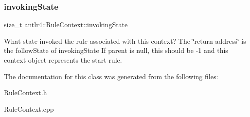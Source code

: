 \subsubsection{\texorpdfstring{invoking\+State}{invokingState}}
{\footnotesize\ttfamily size\+\_\+t antlr4\+::\+Rule\+Context\+::invoking\+State}

What state invoked the rule associated with this context? The \char`\"{}return address\char`\"{} is the follow\+State of invoking\+State If parent is null, this should be -\/1 and this context object represents the start rule. 

The documentation for this class was generated from the following files\+:\begin{DoxyCompactItemize}
\item 
Rule\+Context.\+h\item 
Rule\+Context.\+cpp\end{DoxyCompactItemize}
